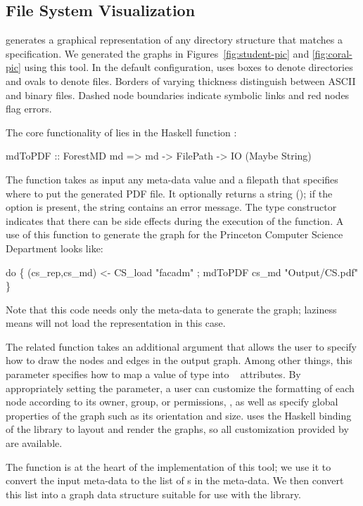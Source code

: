 \subsection{File System Visualization}
\fg{} generates a graphical representation of any directory structure
that matches a \forest{} specification.  We generated the graphs in
Figures~\ref{fig:student-pic} and \ref{fig:coral-pic} using  
this tool.  In the default configuration, \fg{} uses boxes to denote
directories and ovals to denote files. Borders of varying
thickness distinguish between ASCII and binary files.  
Dashed node boundaries indicate symbolic links and red nodes flag errors.

The core functionality of \fg{} lies in the Haskell function :
\begin{code}
mdToPDF :: ForestMD md => 
     md -> FilePath -> IO (Maybe String)
\end{code}
The function takes as input any meta-data value and a
filepath that specifies where to 
put the generated PDF file.  It optionally returns a string (); if the option is present, the string contains an error
message.  The  type constructor indicates that there can be
side effects during the execution of the function.  A use of
this function to generate the graph for the Princeton Computer Science
Department looks like:
\begin{code}
 do \{ (cs_rep,cs_md) <- CS_load  "facadm"
    ; mdToPDF cs_md "Output/CS.pdf"       \}
\end{code}
Note that this code needs only the meta-data to generate the graph;
laziness means \forest{} will not load the representation in this
case. 

The related function  takes an additional
argument that allows the user to specify how to draw the nodes and
edges in the output graph.  Among other things, this parameter
specifies how to map a value of type  into
\graphviz{}~\cite{haskell-graphviz,Gansner+:graphviz} attributes.  By appropriately setting the
parameter, a user can customize the formatting of each node according
to its owner, group, or permissions, \etc{}, as well as specify global
properties of the graph such as its orientation and size.  \fg{} uses
the Haskell binding of the \graphviz{} library to layout and render
the graphs, so all customization provided by \graphviz{} are
available.

The  function is at the heart of the implementation of
this tool; we use it to convert the input meta-data to the list of
s in the meta-data.  We then convert this list into a
graph data structure suitable for use with the \graphviz{} library.

